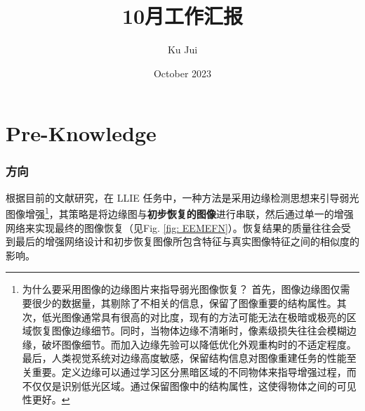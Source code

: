 \documentclass[a4paper, 10pt]{article}
\begin{document}
	
	
	\title{\songti {}10月工作汇报}
	\author{\textrm{Ku Jui}}
	\date{\textrm{October 2023}}
	\maketitle
	
	\renewcommand{\figurename}{Figure} %
	\renewcommand{\contentsname}{Contents}
	\renewcommand{\tablename}{Table}
	\tableofcontents  %
	
	\part{Pre-Knowledge}	
	
	\section{方向}
		
		根据目前的文献研究，在 LLIE 任务中，一种方法是采用边缘检测思想来引导弱光图像增强\footnote{为什么要采用图像的边缘图片来指导弱光图像恢复？
		首先，图像边缘图仅需要很少的数据量，其剔除了不相关的信息，保留了图像重要的结构属性。其次，低光图像通常具有很高的对比度，现有的方法可能无法在极暗或极亮的区域恢复图像边缘细节。同时，当物体边缘不清晰时，像素级损失往往会模糊边缘，破坏图像细节。而加入边缘先验可以降低优化外观重构时的不适定程度。最后，人类视觉系统对边缘高度敏感，保留结构信息对图像重建任务的性能至关重要。定义边缘可以通过学习区分黑暗区域的不同物体来指导增强过程，而不仅仅是识别低光区域。通过保留图像中的结构属性，这使得物体之间的可见性更好。}，其策略是将边缘图与\textbf{初步恢复的图像}进行串联，然后通过单一的增强网络来实现最终的图像恢复（见Fig. \ref{fig: EEMEFN}）。恢复结果的质量往往会受到最后的增强网络设计和初步恢复图像所包含特征与真实图像特征之间的相似度的影响。
		
\end{document}
